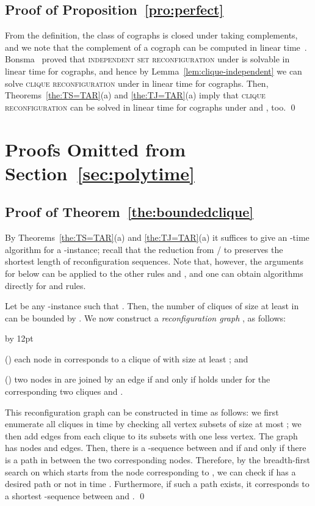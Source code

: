 \documentclass{llncs}
\newenvironment{listing}[1]{\begin{list}{*}{\settowidth{\labelwidth}{#1}\setlength{\leftmargin}{\labelwidth}\advance \leftmargin by 12pt
\setlength{\itemsep}{0pt}\setlength{\parsep}{0pt}\setlength{\topsep}{0pt}\setlength{\parskip}{0pt}}}{\end{list}}
\newcounter{one}
\newcommand{\one}{{\rm \roman{one}}}
\newcounter{two}
\newcommand{\two}{{\rm \roman{two}}}
\begin{document}
	\subsection{Proof of Proposition~\ref{pro:perfect}}
From the definition, the class of cographs is closed under taking complements, and we note that the complement of a cograph can be computed in linear time~\cite{CorneilPS85}.
	Bonsma~\cite{Bon14} proved that \textsc{independent set reconfiguration} under  is solvable in linear time for cographs, and hence by Lemma~\ref{lem:clique-independent} we can solve \textsc{clique reconfiguration} under  in linear time for cographs. 
	Then, Theorems~\ref{the:TS=TAR}(a) and \ref{the:TJ=TAR}(a) imply that \textsc{clique reconfiguration} can be solved in linear time for cographs under  and , too.
	\qed





	\section{Proofs Omitted from Section~\ref{sec:polytime}}
	
	\subsection{Proof of Theorem~\ref{the:boundedclique}}
By Theorems~\ref{the:TS=TAR}(a) and \ref{the:TJ=TAR}(a) it suffices to give an -time algorithm for a -instance;
	recall that the reduction from / to  preserves the shortest length of reconfiguration sequences.
	Note that, however, the arguments for  below can be applied to the other rules  and , and one can obtain algorithms directly for  and  rules.

	Let  be any -instance such that .
	Then, the number of cliques of size at least  in  can be bounded by .
	We now construct a \textit{reconfiguration graph} , as follows: 
		\begin{listing}{aaa}
		\item[(\one)] each node in  corresponds to a clique of  with size at least ; and 
		\item[(\two)] two nodes in  are joined by an edge if and only if  holds under  for the corresponding two cliques  and .  
		\end{listing}
	This reconfiguration graph  can be constructed in time  as follows:
	we first enumerate all cliques in time  by checking all  vertex subsets of size at most ;
	we then add edges from each clique to its  subsets with one less vertex.
	The graph  has  nodes and  edges. 
	Then, there is a -sequence between  and  if and only if there is a path in  between the two corresponding nodes. 
	Therefore, by the breadth-first search on  which starts from the node corresponding to , we can check if  has a desired path or not in time . 
	Furthermore, if such a path exists, it corresponds to a shortest -sequence between  and . 
	\qed
\end{document}
